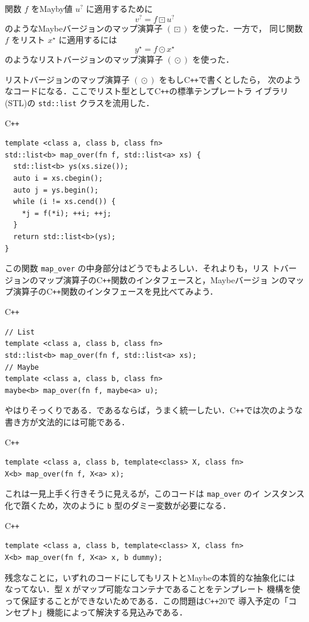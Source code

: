 \documentclass[a5paper,twoside,fleqn,draft]{jsbook}
\newcommand{\programminglanguage}[1]{\textsf{#1}}
\newcommand{\cxx}{\programminglanguage{C}\texttt{++}}
\newcommand{\cxxtwelve}{\cxx\programminglanguage{20}}
\newcommand{\code}[1]{\texttt{#1}}
\newenvironment{cxxcode}{\begin{itembox}[r]{\cxx}}{\end{itembox}}
\DeclareMathOperator{\mMapList}{\odot}
\DeclareMathOperator{\mMapMaybe}{\boxdot}
\newcommand{\mList}[1]{{#1}^\mathrm{\star}}
\newcommand{\mMaybe}[1]{{#1}^?}
\begin{document}
関数 $f$ をMayby値 $\mMaybe{u}$ に適用するために
\begin{equation}
\mMaybe{v}=f\mMapMaybe\mMaybe{u}
\end{equation}
のようなMaybeバージョンのマップ演算子 $(\mMapMaybe)$ を使った．一方で，
同じ関数 $f$ をリスト $\mList{x}$ に適用するには
\begin{equation}
\mList{y}=f\mMapList\mList{x}
\end{equation}
のようなリストバージョンのマップ演算子 $(\mMapList)$ を使った．

リストバージョンのマップ演算子 $(\mMapList)$ をもし\cxx で書くとしたら，
次のようなコードになる．ここでリスト型として\cxx の標準テンプレートラ
イブラリ(STL)の \code{std::list} クラスを流用した．
\begin{cxxcode}
\begin{verbatim}
template <class a, class b, class fn>
std::list<b> map_over(fn f, std::list<a> xs) {
  std::list<b> ys(xs.size());
  auto i = xs.cbegin();
  auto j = ys.begin();
  while (i != xs.cend()) {
    *j = f(*i); ++i; ++j;
  }
  return std::list<b>(ys);
}
\end{verbatim}
\end{cxxcode}
この関数 \code{map\_over} の中身部分はどうでもよろしい．それよりも，リス
トバージョンのマップ演算子の\cxx 関数のインタフェースと，Maybeバージョ
ンのマップ演算子の\cxx 関数のインタフェースを見比べてみよう．
\begin{cxxcode}
\begin{verbatim}
// List
template <class a, class b, class fn>
std::list<b> map_over(fn f, std::list<a> xs);
// Maybe
template <class a, class b, class fn>
maybe<b> map_over(fn f, maybe<a> u);
\end{verbatim}
\end{cxxcode}
やはりそっくりである．であるならば，うまく統一したい．\cxx では次のような書き方が文法的には可能である．
\begin{cxxcode}
\begin{verbatim}
template <class a, class b, template<class> X, class fn>
X<b> map_over(fn f, X<a> x);
\end{verbatim}
\end{cxxcode}
これは一見上手く行きそうに見えるが，このコードは \code{map\_over} のイ
ンスタンス化で躓くため，次のように \code{b} 型のダミー変数が必要になる．
\begin{cxxcode}
\begin{verbatim}
template <class a, class b, template<class> X, class fn>
X<b> map_over(fn f, X<a> x, b dummy);
\end{verbatim}
\end{cxxcode}
残念なことに，いずれのコードにしてもリストとMaybeの本質的な抽象化には
なってない．型 \code{X} がマップ可能なコンテナであることをテンプレート
機構を使って保証することができないためである．この問題は\cxxtwelve で
導入予定の「コンセプト」機能によって解決する見込みである．
\end{document}
